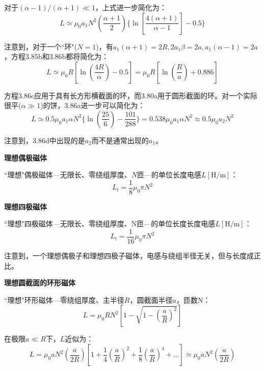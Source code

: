 对于$(\alpha-1)/(\alpha+1)\ll 1$，上式进一步简化为：
\begin{equation*}
L\simeq\mu_0a_1N^2(\frac{\alpha+1}{2})\{\ln[\frac{4(\alpha+1)}{\alpha-1}]-0.5\} \tag{3.86'}%
\end{equation*}

注意到，对于一个``环"($N=1$)，有$a_1(\alpha+1)=2R,2a_1\beta=2a,a_1(\alpha-1)=2a$，方程3.85b和3.86b都将简化为：
\begin{equation*}
L\simeq\mu_0R[\ln(\frac{4R}{\alpha})-0.5]=\mu_0R[\ln(\frac{R}{a})+0.886] \tag{3.86''}%
\end{equation*}

方程3.86c应用于具有长方形横截面的环，而3.80a用于圆形截面的环。对一个实际很平($\alpha\gg 1$)的饼，3.86a进一步可以简化为：
\begin{equation*}
L  \simeq  0.5\mu_0a_1\alpha N^2\{\ln(\frac{25}{6})-\frac{101}{288}\}=0.538\mu_0a_1\alpha N^2\approx 0.5\mu_0a_2N^2 \tag{3.86'''}%
\end{equation*}

注意到，3.86d中出现的是$a_2$而不是通常出现的$a_1$。

\textbf{理想偶极磁体}

  ``理想"偶极磁体---无限长、零绕组厚度、$N$匝---的单位长度电感$L\mathrm{[H/m]}$：
\begin{equation}
L_l=\frac{1}{8}\mu_0\pi N^2%
\end{equation}

\textbf{理想四极磁体}

  ``理想"四极磁体---无限长、零绕组厚度、N匝---的单位长度长度电感$L\mathrm{[H/m]}$：
  \begin{equation}
L_l=\frac{1}{16}\mu_0\pi N^2%
\end{equation}

注意到，一个理想偶极子和理想四极子磁体，电感与绕组半径无关，但与长度成正比。

\textbf{理想圆截面的环形磁体}

  ``理想"环形磁体---零绕组厚度、主半径$R$，圆截面半径$a$，匝数N：
  \begin{equation}
 L=\mu_0RN^2[1-\sqrt{1-(\frac{a}{R})^2}]%
\end{equation}

在极限$a\ll R$下，$L$近似为：
\begin{equation*}
 L=\mu_0aN^2(\frac{a}{2R})[1+\frac{1}{4}(\frac{a}{R})^2+\frac{1}{8}(\frac{a}{R})^4+...]\simeq\mu_0aN^2(\frac{a}{2R}) \tag{3.89'}%
\end{equation*}

